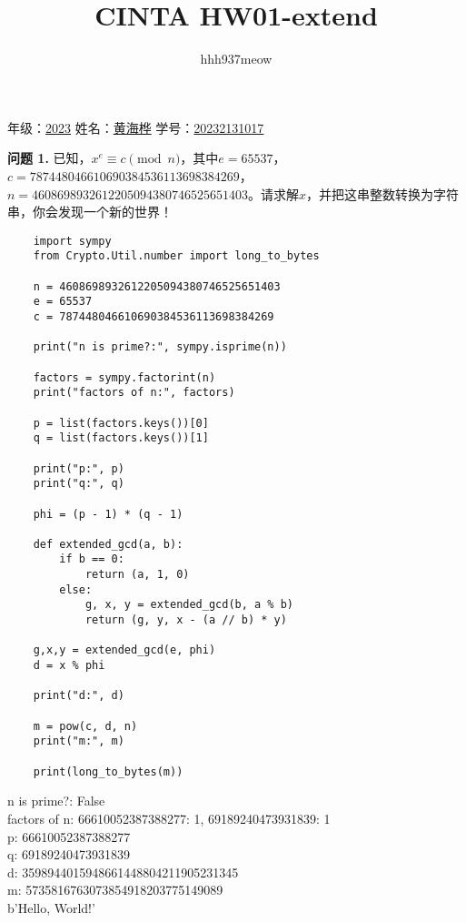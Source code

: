 \documentclass[a4paper]{CINTA}
\title{CINTA HW01-extend}
\author{hhh937meow}
\begin{document}
\maketitle
\begin{center}
    年级：\underline{2023\hspace{1.5cm}}
    姓名：\underline{黄海桦\hspace{1.5cm}}
    学号：\underline{20232131017\hspace{2.5cm}}
\end{center}

\textbf{问题 1.} 已知，$x^e \equiv c \pmod{n}$，其中$e = 65537$，$c = 787448046610690384536113698384269$，$n = 4608698932612205094380746525651403$。请求解$x$，并把这串整数转换为字符串，你会发现一个新的世界！\\
\begin{verbatim}
    import sympy
    from Crypto.Util.number import long_to_bytes

    n = 4608698932612205094380746525651403
    e = 65537
    c = 787448046610690384536113698384269

    print("n is prime?:", sympy.isprime(n))

    factors = sympy.factorint(n)
    print("factors of n:", factors)

    p = list(factors.keys())[0]
    q = list(factors.keys())[1]

    print("p:", p)
    print("q:", q)

    phi = (p - 1) * (q - 1)

    def extended_gcd(a, b):
        if b == 0:
            return (a, 1, 0)
        else:
            g, x, y = extended_gcd(b, a % b)
            return (g, y, x - (a // b) * y)
        
    g,x,y = extended_gcd(e, phi)
    d = x % phi

    print("d:", d)

    m = pow(c, d, n)
    print("m:", m)

    print(long_to_bytes(m))
\end{verbatim}

n is prime?: False \\
factors of n: {66610052387388277: 1, 69189240473931839: 1} \\
p: 66610052387388277\\
q: 69189240473931839\\
d: 3598944015948661448804211905231345\\
m: 5735816763073854918203775149089\\
b'Hello, World!'
\end{document}
